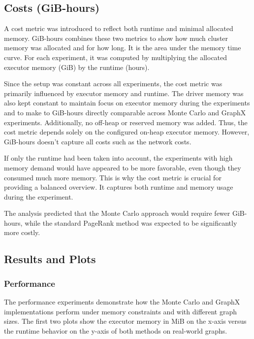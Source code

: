 \subsection{Costs (GiB-hours)}
A cost metric was introduced to reflect both runtime and minimal allocated memory. GiB-hours combines these two metrics to show how much cluster memory was allocated and for how long. It is the area under the memory time curve. For each experiment, it was computed by multiplying the allocated executor memory (GiB) by the runtime (hours). \par
Since the setup was constant across all experiments, the cost metric was primarily influenced by executor memory and runtime. The driver memory was also kept constant to maintain focus on executor memory during the experiments and to make to GiB-hours directly comparable across Monte Carlo and GraphX experiments. Additionally, no off-heap or reserved memory was added. Thus, the cost metric depends solely on the configured on-heap executor memory. However, GiB-hours doesn't capture all costs such as the network costs.\par
If only the runtime had been taken into account, the experiments with high memory demand would have appeared to be more favorable, even though they consumed much more memory. This is why the cost metric is crucial for providing a balanced overview. It captures both runtime and memory usage during the experiment. \par
The analysis predicted that the Monte Carlo approach would require fewer GiB-hours, while the standard PageRank method was expected to be significantly more costly.


\subsection{Results and Plots}

\subsubsection{Performance}

The performance experiments demonstrate how the Monte Carlo and GraphX implementations perform under memory constraints and with different graph sizes. The first two plots show the executor memory in MiB on the x-axis versus the runtime behavior on the y-axis of both methods on real-world graphs. \par

